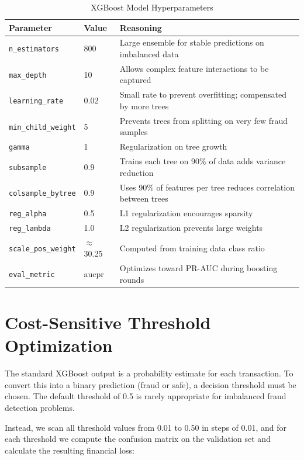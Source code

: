 \begin{table}[H]
\centering
\caption{XGBoost Model Hyperparameters}
\label{tab:xgb_params}
\begin{tabular}{|l|l|p{5.5cm}|}
\hline
\textbf{Parameter} & \textbf{Value} & \textbf{Reasoning}\\
\hline
\texttt{n\_estimators} & 800 & Large ensemble for stable predictions on imbalanced data\\
\hline
\texttt{max\_depth} & 10 & Allows complex feature interactions to be captured\\
\hline
\texttt{learning\_rate} & 0.02 & Small rate to prevent overfitting; compensated by more trees\\
\hline
\texttt{min\_child\_weight} & 5 & Prevents trees from splitting on very few fraud samples\\
\hline
\texttt{gamma} & 1 & Regularization on tree growth\\
\hline
\texttt{subsample} & 0.9 & Trains each tree on 90\% of data adds variance reduction\\
\hline
\texttt{colsample\_bytree} & 0.9 & Uses 90\% of features per tree reduces correlation between trees\\
\hline
\texttt{reg\_alpha} & 0.5 & L1 regularization encourages sparsity\\
\hline
\texttt{reg\_lambda} & 1.0 & L2 regularization prevents large weights\\
\hline
\texttt{scale\_pos\_weight} & $\approx$30.25 & Computed from training data class ratio\\
\hline
\texttt{eval\_metric} & aucpr & Optimizes toward PR-AUC during boosting rounds\\
\hline
\end{tabular}
\end{table}

\section{Cost-Sensitive Threshold Optimization}

The standard XGBoost output is a probability estimate for each transaction. To convert this into a binary prediction (fraud or safe), a decision threshold must be chosen. The default threshold of 0.5 is rarely appropriate for imbalanced fraud detection problems.

Instead, we scan all threshold values from 0.01 to 0.50 in steps of 0.01, and for each threshold we compute the confusion matrix on the validation set and calculate the resulting financial loss:

